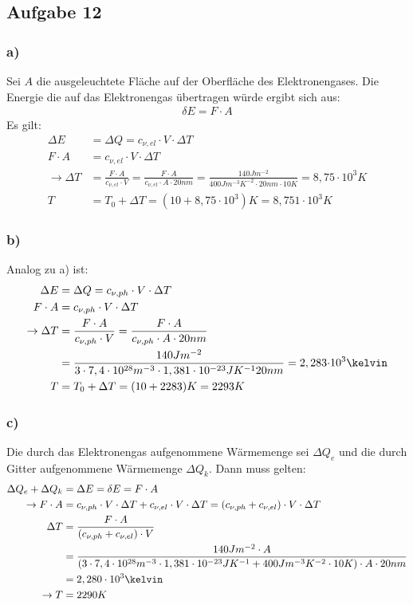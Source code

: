 \subsection*{Aufgabe 12}
\subsubsection*{a)}
Sei $A$ die ausgeleuchtete Fläche auf der Oberfläche des Elektronengases. Die Energie die auf das Elektronengas übertragen würde ergibt sich aus:
\begin{align*}
\delta E = F\cdot A
\end{align*}
Es gilt:
\begin{align*}
\Delta E &= \Delta Q= c_{\nu,el}\cdot V\cdot\Delta T\\
F\cdot A&= c_{\nu,el}\cdot V\cdot\Delta T\\
\rightarrow \Delta T &= \frac{F\cdot A}{c_{\nu,el}\cdot V} = \frac{F\cdot A}{c_{\nu,el}\cdot A\cdot \unit{20}{nm}} =  \frac{\unit{140}{Jm^{-2}}}{\unit{400}{Jm^{-3}K^{-2}}\cdot \unit{20}{nm}\cdot\unit{10}{K}} =8,75\cdot10^3K\\
T&=T_0+\Delta T = (10+8,75\cdot10^3)K = 8,751\cdot10^3K
\end{align*}

\subsubsection*{b)}
Analog zu a) ist:
\begin{align*}
\Delta E &= \Delta Q= c_{\nu,ph}\cdot V\cdot\Delta T\\
F\cdot A&= c_{\nu,ph}\cdot V\cdot\Delta T\\
\rightarrow \Delta T &= \frac{F\cdot A}{c_{\nu,ph}\cdot V} = \frac{F\cdot A}{c_{\nu,ph}\cdot A\cdot \unit{20}{nm}} \\
&=\frac{\unit{140}{Jm^{-2}}}{3 \cdot 7,4\cdot10^{28}\unit{}{m^{-3}}\cdot1,381\cdot10^{-23}\unit{}{JK^{-1}} \unit{20}{nm}}=
\unit{2,283}{\cdot 10^3}{\kelvin}\\
T&=T_0+\Delta T = (10+2283)K = 2293 K
\end{align*}
\subsubsection*{c)}
Die durch das Elektronengas aufgenommene Wärmemenge sei $\Delta Q_e$ und die durch Gitter aufgenommene Wärmemenge $\Delta Q_k$. Dann muss gelten:
\begin{align*}
\Delta Q_e+\Delta Q_k &= \Delta E = \delta E = F\cdot A\\
\rightarrow F\cdot A &=c_{\nu,ph}\cdot V\cdot\Delta T+c_{\nu,el}\cdot V\cdot\Delta T = (c_{\nu,ph}+c_{\nu,el})\cdot V\cdot\Delta T\\
\Delta T &= \frac{F\cdot A}{(c_{\nu,ph}+c_{\nu,el})\cdot V}\\
&= \frac{\unit{140}{Jm^{-2}}\cdot A}{(3 \cdot 7,4\cdot10^{28}\unit{}{m^{-3}}\cdot1,381\cdot10^{-23}\unit{}{JK^{-1}}+\unit{400}{Jm^{-3}K^{-2}}\cdot\unit{10}{K})\cdot A\cdot \unit{20}{nm}}\\
&= 2,280\cdot10^3\kelvin\\
\rightarrow T &= 2290 K
\end{align*}

